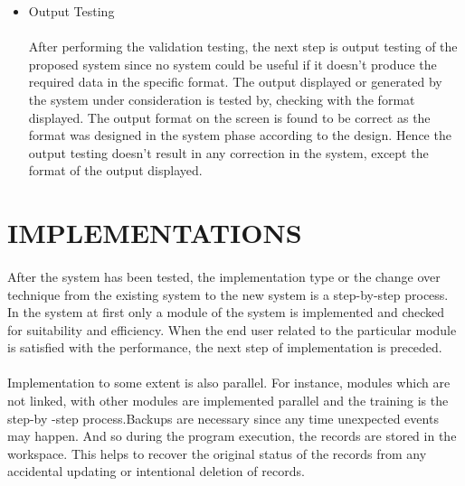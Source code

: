 \documentclass[a4paper, 12pt]{report}
\begin{document}
{{{{\begin{itemize}
\paragraph{}Software is completely assembled as a package, interface errors have been uncovered
and corrected and final series of software tests, validation tests begins. Validation testing can
be defined many, but a simple definition is that validation succeeds when the software
functions in a manner that can be reasonably accepted by the customer.
\item Output Testing
\paragraph{}After performing the validation testing, the next step is output testing of the proposed system
since no system could be useful if it doesn’t produce the required data in the specific format.
The output displayed or generated by the system under consideration is tested by, checking
with the format displayed. The output format on the screen is found to be correct as the
format was designed in the system phase according to the design. Hence the output testing
doesn’t result in any correction in the system, except the format of the output displayed.
\end{itemize}
\newpage


\section{IMPLEMENTATIONS}
\paragraph{}
	After the system has been tested, the implementation type or the change over technique from the existing system to the new system is a step-by-step process. In the system at first only a module of the system is implemented and checked for suitability and efficiency. When the end user related to the particular module is satisfied with the performance, the next step of implementation is preceded.
	\paragraph{}
Implementation to some extent is also parallel. For instance, modules which are not linked, with other modules are implemented parallel and the training is the step-by -step process.Backups are necessary since any time unexpected events may happen. And so during the program execution, the records are stored in the workspace. This helps to recover the original status of the records from any accidental updating or intentional deletion of records.

}}}}
\end{document}
